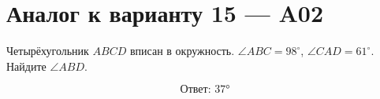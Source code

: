 


\section*{Аналог к варианту 15 — A02}
Четырёхугольник \(ABCD\) вписан в окружность. \(\angle ABC=98^\circ\), \(\angle CAD=61^\circ\). Найдите \(\angle ABD\).
\begin{center}\figCyclicChord\end{center}
\[\boxed{\text{Ответ: }37°}\]

